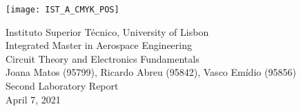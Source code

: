 \thispagestyle {empty}

\texttt{[image: IST\_A\_CMYK\_POS]}

\begin{center}
%
\vspace{1.0cm}

\vspace{1cm}
{\FontLb Instituto Superior Técnico, University of Lisbon} \\ %
\vspace{1cm}
{\FontLb Integrated Master in Aerospace Engineering} \\ %
\vspace{1cm}
{\FontSn Circuit Theory and Electronics Fundamentals} \\ %
\vspace{1cm}
{\FontSn Joana Matos (95799), Ricardo Abreu (95842), Vasco Emídio (95856)} \\ %
\vspace{1cm}
{\FontSn Second Laboratory Report} \\
\vspace{1cm}
{\FontSn April 7, 2021} \\ %
%
\end{center}

